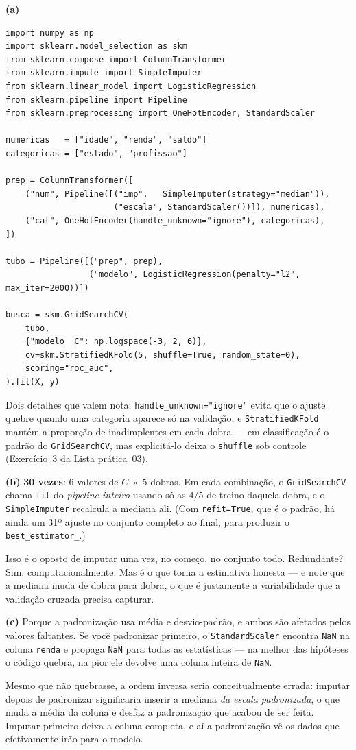 \documentclass[11pt,a4paper]{article}
\begin{document}
\begin{solucao}
\textbf{(a)}
\begin{lstlisting}
import numpy as np
import sklearn.model_selection as skm
from sklearn.compose import ColumnTransformer
from sklearn.impute import SimpleImputer
from sklearn.linear_model import LogisticRegression
from sklearn.pipeline import Pipeline
from sklearn.preprocessing import OneHotEncoder, StandardScaler

numericas   = ["idade", "renda", "saldo"]
categoricas = ["estado", "profissao"]

prep = ColumnTransformer([
    ("num", Pipeline([("imp",   SimpleImputer(strategy="median")),
                      ("escala", StandardScaler())]), numericas),
    ("cat", OneHotEncoder(handle_unknown="ignore"), categoricas),
])

tubo = Pipeline([("prep", prep),
                 ("modelo", LogisticRegression(penalty="l2", max_iter=2000))])

busca = skm.GridSearchCV(
    tubo,
    {"modelo__C": np.logspace(-3, 2, 6)},
    cv=skm.StratifiedKFold(5, shuffle=True, random_state=0),
    scoring="roc_auc",
).fit(X, y)
\end{lstlisting}
Dois detalhes que valem nota: \texttt{handle\_unknown="ignore"} evita que o ajuste
quebre quando uma categoria aparece só na validação, e
\texttt{StratifiedKFold} mantém a proporção de inadimplentes em cada dobra --- em
classificação é o padrão do \texttt{GridSearchCV}, mas explicitá-lo deixa o
\texttt{shuffle} sob controle (Exercício~3 da Lista prática~03).

\smallskip
\textbf{(b)} \textbf{30 vezes}: $6$ valores de $C$ $\times$ $5$ dobras. Em cada
combinação, o \texttt{GridSearchCV} chama \texttt{fit} do \emph{pipeline inteiro}
usando só as $4/5$ de treino daquela dobra, e o \texttt{SimpleImputer} recalcula a
mediana ali. (Com \texttt{refit=True}, que é o padrão, há ainda um 31º ajuste no
conjunto completo ao final, para produzir o \texttt{best\_estimator\_}.)

Isso é o oposto de imputar uma vez, no começo, no conjunto todo. Redundante? Sim,
computacionalmente. Mas é o que torna a estimativa honesta --- e note que a
mediana muda de dobra para dobra, o que é justamente a variabilidade que a
validação cruzada precisa capturar.

\smallskip
\textbf{(c)} Porque a padronização usa média e desvio-padrão, e ambos são afetados
pelos valores faltantes. Se você padronizar primeiro, o \texttt{StandardScaler}
encontra \texttt{NaN} na coluna \texttt{renda} e propaga \texttt{NaN} para todas
as estatísticas --- na melhor das hipóteses o código quebra, na pior ele devolve
uma coluna inteira de \texttt{NaN}.

Mesmo que não quebrasse, a ordem inversa seria conceitualmente errada: imputar
depois de padronizar significaria inserir a mediana \emph{da escala padronizada},
o que muda a média da coluna e desfaz a padronização que acabou de ser feita.
Imputar primeiro deixa a coluna completa, e aí a padronização vê os dados que
efetivamente irão para o modelo.
\end{solucao}
\end{document}
